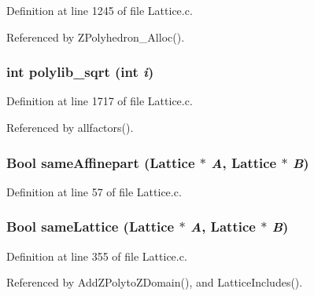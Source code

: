 Definition at line 1245 of file Lattice.c.

Referenced by ZPolyhedron\_\-Alloc().

\subsubsection{\setlength{\rightskip}{0pt plus 5cm}int polylib\_\-sqrt (int {\em i})\hspace{0.3cm}{\tt  [static]}}\label{Lattice_8c_a38}




Definition at line 1717 of file Lattice.c.

Referenced by allfactors().

\subsubsection{\setlength{\rightskip}{0pt plus 5cm}Bool same\-Affinepart (Lattice $\ast$ {\em A}, Lattice $\ast$ {\em B})}\label{Lattice_8c_a4}




Definition at line 57 of file Lattice.c.
\subsubsection{\setlength{\rightskip}{0pt plus 5cm}Bool same\-Lattice (Lattice $\ast$ {\em A}, Lattice $\ast$ {\em B})}\label{Lattice_8c_a12}




Definition at line 355 of file Lattice.c.

Referenced by Add\-ZPolyto\-ZDomain(), and Lattice\-Includes().

